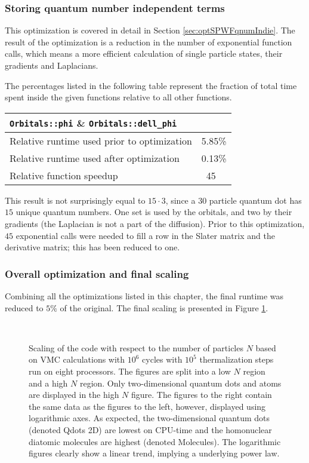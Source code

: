 \subsubsection{Storing quantum number independent terms}

This optimization is covered in detail in Section \ref{sec:optSPWFqnumIndie}. The result of the optimization is a reduction in the number of exponential function calls, which means a more efficient calculation of single particle states, their gradients and Laplacians.

The percentages listed in the following table represent the fraction of total time spent inside the given functions relative to all other functions. 

\begin{tabular}{ll}
 \verb+Orbitals::phi+ \& \verb+Orbitals::dell_phi+ & \\
 \hline\hline
 Relative runtime used prior to optimization & 5.85\% \\
 Relative runtime used after optimization    & 0.13\% \\
 \hline
 Relative function speedup                   & ~45
\end{tabular}

This result is not surprisingly equal to $15\cdot 3$, since a $30$ particle quantum dot has $15$ unique quantum numbers. One set is used by the orbitals, and two by their gradients (the Laplacian is not a part of the diffusion). Prior to this optimization, $45$ exponential calls were needed to fill a row in the Slater matrix and the derivative matrix; this has been reduced to one.

\subsubsection{Overall optimization and final scaling}

Combining all the optimizations listed in this chapter, the final runtime was reduced to $5\%$ of the original. The final scaling is presented in Figure \ref{fig:scaling}.

\begin{figure}[h]
 \begin{center}
   \\
  \caption{Scaling of the code with respect to the number of particles $N$ based on VMC calculations with $10^6$ cycles with $10^5$ thermalization steps run on eight processors. The figures are split into a low $N$ region and a high $N$ region. Only two-dimensional quantum dots and atoms are displayed in the high $N$ figure. The figures to the right contain the same data as the figures to the left, however, displayed using logarithmic axes. As expected, the two-dimensional quantum dots (denoted Qdots 2D) are lowest on CPU-time and the homonuclear diatomic molecules are highest (denoted Molecules). The logarithmic figures clearly show a linear trend, implying a underlying power law.}
  \label{fig:scaling}
 \end{center}
\end{figure}

